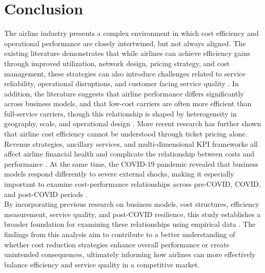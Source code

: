 \documentclass[11pt, letterpaper]{article}
\begin{document}
\section{Conclusion}
The airline industry presents a complex environment in which cost efficiency and operational performance are closely intertwined, but not always aligned. The existing literature demonstrates that while airlines can achieve efficiency gains through improved utilization, network design, pricing strategy, and cost management, these strategies can also introduce challenges related to service reliability, operational disruptions, and customer facing service quality \cite{Anupkumar2023,Barbot2008,Caves1984,GillenLall2004,Lee2023,MayerSinai2002,Zuidberg2014}. In addition, the literature suggests that airline performance differs significantly across business models, and that low-cost carriers are often more efficient than full-service carriers, though this relationship is shaped by heterogeneity in geography, scale, and operational design \cite{Barbot2008,Li2025}.
\indent More recent research has further shown that airline cost efficiency cannot be understood through ticket pricing alone. Revenue strategies, ancillary services, and multi-dimensional KPI frameworks all affect airline financial health and complicate the relationship between costs and performance \cite{Moghadasnian2025,Zhou2020}. At the same time, the COVID-19 pandemic revealed that business models respond differently to severe external shocks, making it especially important to examine cost-performance relationships across pre-COVID, COVID, and post-COVID periods \cite{FontanetPerez2022,Gudmundsson2021}.\\
\indent By incorporating previous research on business models, cost structures, efficiency measurement, service quality, and post-COVID resilience, this study establishes a broader foundation for examining these relationships using empirical data \cite{FontanetPerez2022,Gudmundsson2021,KAYA2023,Li2025,Nguyen2022,Yalvac2026}. The findings from this analysis aim to contribute to a better understanding of whether cost reduction strategies enhance overall performance or create unintended consequences, ultimately informing how airlines can more effectively balance efficiency and service quality in a competitive market.



\end{document}
